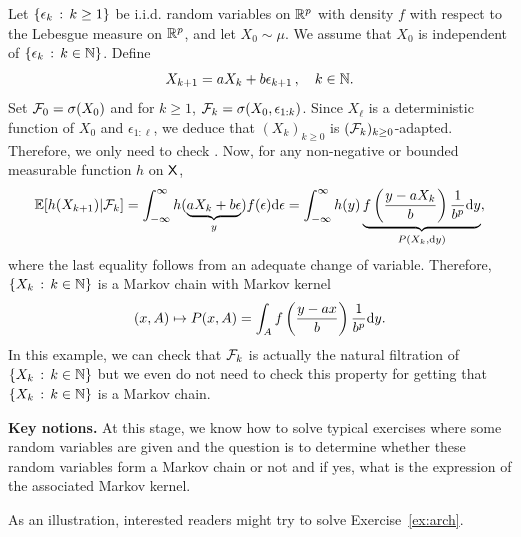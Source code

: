 \documentclass[english,graybox,envcountchap,envcountsame,sectrefs,shortlabels]{svmono}
\theoremstyle{style}
\newcommand{\blb}{\begin{leftbar}}
\newcommand{\elb}{\end{leftbar}}
\begin{document}
\begin{example}
Let $\left\{ \epsilon_{k}\,:\,k\geq1\right\}$ be i.i.d. random variables on $\mathbb{R}^{p}$
with density $f$ with respect to the Lebesgue measure on $\mathbb{R}^{p}$,
and let $X_{0}\sim\mu$. We assume that $X_{0}$ is independent of
$\left\{ \epsilon_{k}\,:\,k\in\mathbb{N}\right\}$. Define
\[
X_{k+1}=aX_{k}+b\epsilon_{k+1}\,,\quad k\in\mathbb{N}.
\]
Set $\mathcal{F}_{0}=\sigma(X_{0})$ and for $k\geq1$, $\mathcal{F}_{k}=\sigma(X_{0},\epsilon_{1:k})$.
Since $X_{\ell}$ is a deterministic function of $X_{0}$ and $\epsilon_{1:\ell}$,
we deduce that $(X_{k})_{k\geq0}$ is $(\mathcal{F}_{k})_{k\geq0}$-adapted.
Therefore, we only need to check . Now, for any
non-negative or bounded measurable function $h$ on $\mathsf{X}$, 
\[
\mathbb{E}[h(X_{k+1})|\mathcal{F}_{k}]=\int_{-\infty}^{\infty}h(\underbrace{aX_{k}+b\epsilon}_{y})f(\epsilon)\mathrm{d}\epsilon=\int_{-\infty}^{\infty}h(y)\underbrace{f\left(\frac{y-aX_{k}}{b}\right)\frac{1}{b^{p}}\mathrm{d} y}_{P(X_{k},\mathrm{d} y)},
\]
where the last equality follows from an adequate change of variable.
Therefore, $\left\{ X_{k}\,:\,k\in\mathbb{N}\right\}$ is a Markov chain with Markov
kernel
\[
(x,A)\mapsto P(x,A)=\int_{A}f\left(\frac{y-ax}{b}\right)\frac{1}{b^{p}}\mathrm{d} y.
\]
In this example, we can check that $\mathcal{F}_{k}$ is actually the natural
filtration of $\left\{ X_{k}\,:\,k\in\mathbb{N}\right\}$ but we even do not need to
check this property for getting that $\left\{ X_{k}\,:\,k\in\mathbb{N}\right\}$ is
a Markov chain.
\end{example}
\blb\textbf{ Key notions. } At this stage, we know how 
to solve typical exercises where some random variables are given and
the question is to determine whether these random variables form a
Markov chain or not and if yes, what is the expression of the associated
Markov kernel. \elb
As an illustration, interested readers might try to solve Exercise~\ref{ex:arch}.
\end{document}
